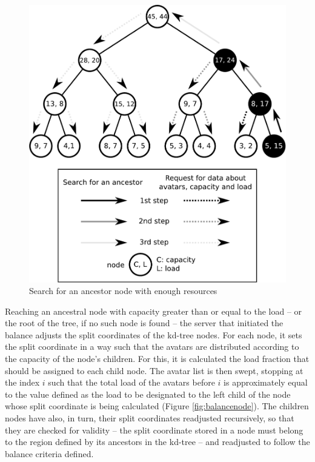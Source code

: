 \documentclass[acmtocl]{acmtrans2m}
\begin{document}
\begin{figure}
  \centering
  \includegraphics[width=0.9\linewidth]{images/ancestors}
  \caption{Search for an ancestor node with enough resources}
   \label{fig:ancestors}
\end{figure}

Reaching an ancestral node with capacity greater than or equal to the load -- or the root of the tree, if no such node is found -- the server that initiated the balance adjusts the split coordinates of the kd-tree nodes. For each node, it sets the split coordinate in a way such that the avatars are distributed according to the capacity of the node's children. For this, it is calculated the load fraction that should be assigned to each child node. The avatar list is then swept, stopping at the index $i$ such that the total load of the avatars before $i$ is approximately equal to the value defined as the load to be designated to the left child of the node whose split coordinate is being calculated (Figure \ref{fig:balancenode}). The children nodes have also, in turn, their split coordinates readjusted recursively, so that they are checked for validity -- the split coordinate stored in a node must belong to the region defined by its ancestors in the kd-tree -- and readjusted to follow the balance criteria defined.
\end{document}
